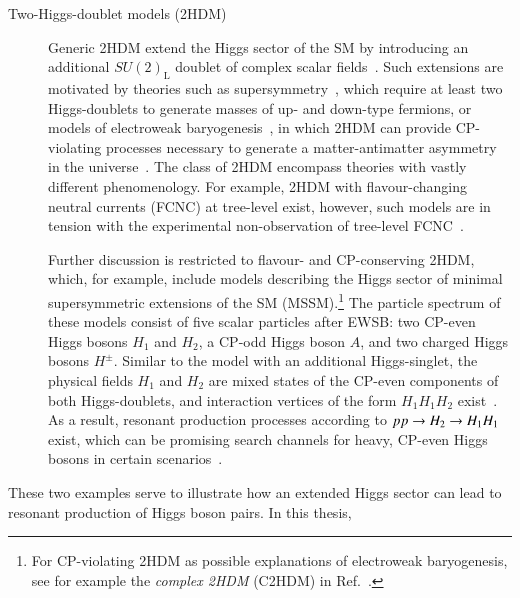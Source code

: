 \begin{description}
\item[Two-Higgs-doublet models (2HDM)] Generic 2HDM extend the Higgs sector of
  the SM by introducing an additional $SU(2)_{\text{L}}$ doublet of complex
  scalar fields~\cite{Gunion:1989we,Branco:2011iw}. Such extensions are
  motivated by theories such as supersymmetry~\cite{Haber:1984rc}, which require
  at least two Higgs-doublets to generate masses of up- and down-type fermions,
  or models of electroweak baryogenesis~\cite{Trodden:1998ym}, in which 2HDM can
  provide CP-violating processes necessary to generate a matter-antimatter
  asymmetry in the universe~\cite{Sakharov:1967dj}. The class of 2HDM encompass
  theories with vastly different phenomenology. For example, 2HDM with
  flavour-changing neutral currents (FCNC) at tree-level exist, however, such
  models are in tension with the experimental non-observation of tree-level
  FCNC~\cite{Gunion:1989we,Branco:2011iw}.

  Further discussion is restricted to flavour- and CP-conserving 2HDM, which,
  for example, include models describing the Higgs sector of minimal
  supersymmetric extensions of the SM (MSSM).\footnote{For CP-violating 2HDM as
    possible explanations of electroweak baryogenesis, see for example the
    \emph{complex 2HDM} (C2HDM) in Ref.~\cite{Fontes:2017zfn}.}
  The particle spectrum of these models consist of five scalar particles after
  EWSB: two CP-even Higgs bosons $H_1$ and $H_2$, a CP-odd Higgs boson $A$, and
  two charged Higgs bosons $H^\pm$. Similar to the model with an additional
  Higgs-singlet, the physical fields $H_1$ and $H_2$ are mixed states of the
  CP-even components of both Higgs-doublets, and interaction vertices of the
  form $H_1 H_1 H_2$ exist~\cite{Gunion:1989we,Branco:2011iw}. As a result,
  resonant production processes according to $pp \to H_2 \to H_1 H_1$ exist,
  which can be promising search channels for heavy, CP-even Higgs bosons in
  certain scenarios~\cite{Dolan:2012ac,Djouadi:2013vqa,Djouadi:2013uqa}.

\end{description}

These two examples serve to illustrate how an extended Higgs sector can lead to
resonant production of Higgs boson pairs. In this thesis,





